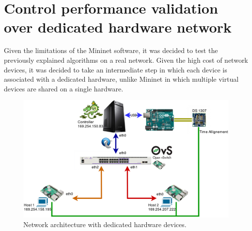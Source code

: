 \section{Control performance validation over dedicated hardware network}
Given the limitations of the Mininet software, it was decided to test the previously explained algorithms on a real network. Given the high cost of network devices, it was decided to take an intermediate step in which each device is associated with a dedicated hardware, unlike Mininet in which multiple virtual devices are shared on a single hardware.
\begin{figure}[tb!]
	\centering
	\includegraphics[width=13cm]{figure/Real_NET.png}
	\caption{Network architecture with dedicated hardware devices.}
	\label{fig:{ONF}}
\end{figure}
